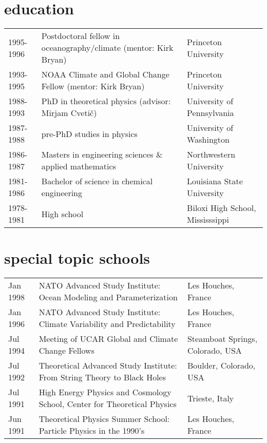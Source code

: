 \documentclass{article}
\begin{document}
\section*{\sc \color{Maroon} education}
\vspace{-.25cm}
\begin{tabular}{lll}
1995-1996  &  Postdoctoral fellow in oceanography/climate (mentor: Kirk Bryan) & Princeton University 
\\
1993-1995  &  NOAA Climate and Global Change Fellow (mentor: Kirk Bryan) & Princeton University 
\\
1988-1993  &  PhD in theoretical physics 
(advisor: Mirjam Cveti\v{c}) 
& University of Pennsylvania 
\\
1987-1988  &  pre-PhD studies in physics & University of Washington
\\
1986-1987  &  Masters in engineering sciences \& applied mathematics   & Northwestern University\\
1981-1986  &  Bachelor of science in chemical engineering  & Louisiana State University \\
1978-1981  & High school  & Biloxi High School, Mississsippi
 \end{tabular}


\vspace{-.2cm}
\section*{\sc \color{Maroon} special topic schools}
\vspace{-.25cm}
\begin{tabular}{lll}
Jan 1998  &  NATO Advanced Study Institute: {\sc Ocean Modeling and Parameterization} & Les Houches, France 
\\
Jan 1996 & NATO Advanced Study Institute: {\sc Climate Variability and Predictability} & Les Houches, France
\\
Jul 1994 & Meeting of UCAR Global and Climate Change Fellows & Steamboat Springs, Colorado, USA
\\
Jul 1992 & Theoretical Advanced Study Institute: {\sc From String Theory to Black Holes} & Boulder, Colorado, USA
\\
Jul 1991 & High Energy Physics and Cosmology School, Center for Theoretical Physics & Trieste, Italy
\\
Jun 1991 & Theoretical Physics Summer School: {\sc Particle Physics in the 1990's} & Les Houches, France
 \end{tabular}
\end{document}
